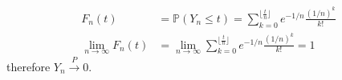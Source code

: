 \documentclass[a4paper,10pt]{article}
\theoremstyle{definition}
\begin{document}
\begin{enumerate}
\begin{enumerate}[(a)]
\begin{align*}
F_n(t) &= \mathbb{P}(Y_n\leq t) = \sum_{k=0}^{\lfloor \frac{t}{n}\rfloor}e^{-1/n}\frac{(1/n)^k}{k!}\\
\lim_{n\to \infty} F_n(t) &= \lim_{n\to \infty}\sum_{k=0}^{\lfloor \frac{t}{n}\rfloor}e^{-1/n}\frac{(1/n)^k}{k!}=1
\end{align*}
therefore $Y_n \overset{P}{\to} 0$.
\end{enumerate}
\end{enumerate}
\end{document}
